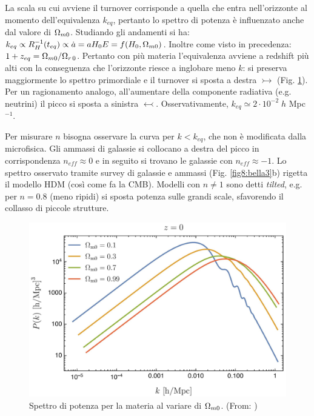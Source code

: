 La scala su cui avviene il turnover corrisponde a quella che entra nell'orizzonte al momento dell'equivalenza $k_{eq}$, pertanto lo spettro di potenza è influenzato anche dal valore di $\Omega_{m0}$. Studiando gli andamenti si ha: $k_{eq}\propto R_H^{-1}(t_{eq}) \propto \dot{a} = a H_0 E = f(H_0,\Omega_{m0})$. Inoltre come visto in precedenza: $1+z_{eq}=\Omega_{m0}/\Omega_{r\, 0}$. Pertanto con più materia l'equivalenza avviene a redshift più alti con la conseguenza che l'orizzonte riesce a inglobare meno $k$: si preserva maggiormente lo spettro primordiale e il turnover si sposta a destra $\rightarrowtail $ (Fig. \ref{fig8:bella2}). Per un ragionamento analogo, all'aumentare della componente radiativa (e.g. neutrini) il picco si sposta a sinistra $\leftarrowtail $. Osservativamente, $k_{eq}\simeq 2\cdot 10^{-2}\; h$ Mpc$^{-1}$.

Per misurare $n$ bisogna osservare la curva per $k<k_{eq}$, che non è modificata dalla microfisica. Gli ammassi di galassie si collocano a destra del picco in corrispondenza $n_{eff}\approx 0$ e in seguito si trovano le galassie con $n_{eff}\approx -1$. Lo spettro osservato tramite survey di galassie e ammassi (Fig. \ref{fig8:bella3}b) rigetta il modello HDM (così come fa la CMB). Modelli con $n\neq 1$ sono detti \textit{tilted}, e.g. per $n=0.8$ (meno ripidi) si sposta potenza sulle grandi scale, sfavorendo il collasso di piccole strutture.
\begin{figure}[ht]
    \centering
    \includegraphics[width=.6\textwidth]{Pictures/8/pertmatevol.jpg}
    \caption{Spettro di potenza per la materia al variare di $\Omega_{m0}$. (From: \cite{Piattella_2018})}\label{fig8:bella2} 
\end{figure}

